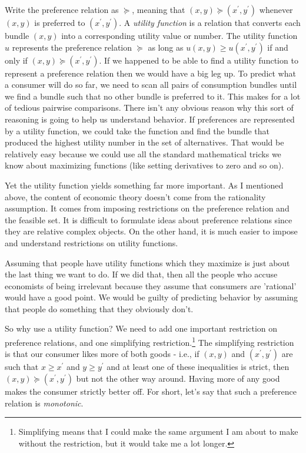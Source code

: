 \documentclass[12pt]{article}
\begin{document}
Write the preference relation as $\succeq$, meaning that $\left(  x,y\right)
\succeq\left(  x^{\prime},y^{\prime}\right)  $ whenever $\left(  x,y\right)  $
is preferred to $\left(  x^{\prime},y^{\prime}\right)  $. A \emph{utility
function} is a relation that converts each bundle $\left(  x,y\right)  $ into
a corresponding utility value or number. The utility function $u$ represents
the preference relation $\succeq$ as long as $u\left(  x,y\right)  \geq
u\left(  x^{\prime},y^{\prime}\right)  $ if and only if $\left(  x,y\right)
\succeq\left(  x^{\prime},y^{\prime}\right)  $. If we happened to be able to
find a utility function to represent a preference relation then we would have
a big leg up. To predict what a consumer will do so far, we need to scan all
pairs of consumption bundles until we find a bundle such that no other bundle
is preferred to it. This makes for a lot of tedious pairwise comparisons.
There isn't any obvious reason why this sort of reasoning is going to help us
understand behavior. If preferences are represented by a utility function, we
could take the function and find the bundle that produced the highest utility
number in the set of alternatives. That would be relatively easy because we
could use all the standard mathematical tricks we know about maximizing
functions (like setting derivatives to zero and so on).

Yet the utility function yields something far more important. As I mentioned
above, the content of economic theory doesn't come from the rationality
assumption. It comes from imposing restrictions on the preference relation and
the feasible set. It is difficult to formulate ideas about preference
relations since they are relative complex objects. On the other hand, it is
much easier to impose and understand restrictions on utility functions.

Assuming that people have utility functions which they maximize is just about
the last thing we want to do. If we did that, then all the people who accuse
economists of being irrelevant because they assume that consumers are
'rational' would have a good point. We would be guilty of predicting behavior
by assuming that people do something that they obviously don't.

So why use a utility function? We need to add one important restriction on
preference relations, and one simplifying restriction.\footnote{Simplifying
means that I could make the same argument I am about to make without the
restriction, but it would take me a lot longer.} The simplifying restriction
is that our consumer likes more of both goods - i.e., if $\left(  x,y\right)
$ and $\left(  x^{\prime},y^{\prime}\right)  $ are such that $x\geq x^{\prime
}$ and $y\geq y^{\prime}$ and at least one of these inequalities is strict,
then $\left(  x,y\right)  \succeq\left(  x^{\prime},y^{\prime}\right)  $ but
not the other way around. Having more of any good makes the consumer strictly
better off. For short, let's say that such a preference relation is
\emph{monotonic}.
\end{document}
